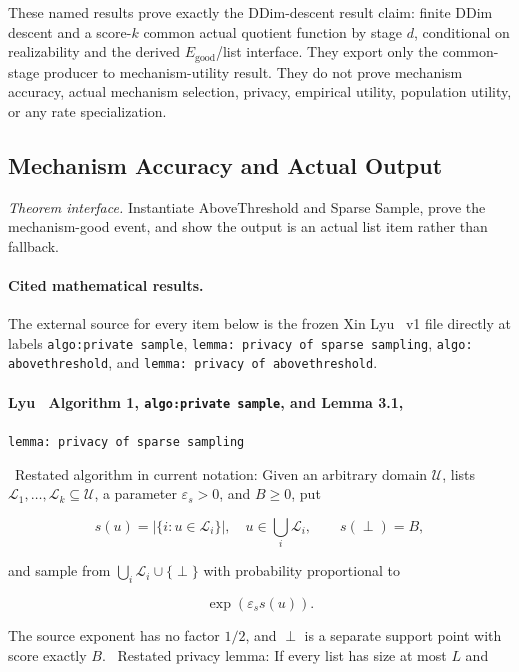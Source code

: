 These named results prove exactly the DDim-descent result claim: finite DDim
descent and a score-\(k\) common actual quotient function by stage \(d\),
conditional on realizability and the derived \(E_{\mathrm{good}}\)/list
interface. They export only the common-stage producer to mechanism-utility result. They do
not prove mechanism accuracy, actual mechanism selection, privacy,
empirical utility, population utility, or any rate specialization.



\subsection{Mechanism Accuracy and Actual Output}\label{app:step_010}

\noindent\textit{Theorem interface.} Instantiate AboveThreshold and Sparse Sample, prove the   mechanism-good event, and show the output is an actual list item rather   than fallback.

\paragraph{Cited mathematical results.}


The external source for every item below is the frozen Xin Lyu~\citep{lyu2025} v1 file
directly at labels \texttt{algo:private sample},
\texttt{lemma: privacy of sparse sampling}, \texttt{algo: abovethreshold}, and
\texttt{lemma: privacy of abovethreshold}.

\paragraph{Lyu~\citep{lyu2025} Algorithm 1, \texttt{algo:private sample}, and Lemma 3.1,}
\texttt{lemma: privacy of sparse sampling}

\noindent\textbullet\ Restated algorithm in current notation: Given an arbitrary domain
  \(\mathcal U\), lists
  \(\mathcal L_1,\ldots,\mathcal L_k\subseteq\mathcal U\), a parameter
  \(\varepsilon_s>0\), and \(B\geq0\), put

  \[
    s(u)=|\{i:u\in\mathcal L_i\}|,
    \quad u\in\bigcup_i\mathcal L_i,
    \qquad s(\perp)=B,
  \]

  and sample from
  \(\bigcup_i\mathcal L_i\cup\{\perp\}\) with probability proportional to

  \[
    \exp(\varepsilon_s s(u)).
    \tag{5}
  \]

  The source exponent has no factor \(1/2\), and \(\perp\) is a separate
  support point with score exactly \(B\).
\noindent\textbullet\ Restated privacy lemma: If every list has size at most \(L\) and

